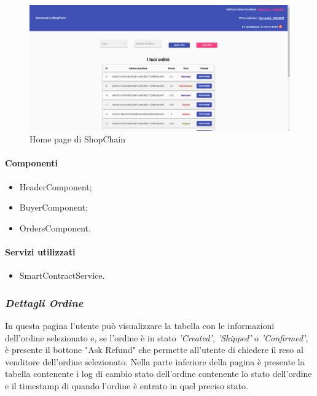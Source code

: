 \begin{figure}[!h] 
    \centering 
    \includegraphics[width=1\columnwidth]{immagini/maschere/homepage.png} 
    \caption{Home page di ShopChain}
\end{figure}

\paragraph{Componenti}
\begin{itemize}
    \item HeaderComponent;
    \item BuyerComponent;
    \item OrdersComponent.
\end{itemize}

\paragraph{Servizi utilizzati}
\begin{itemize}
    \item SmartContractService.
\end{itemize}

\newpage

\subsubsection*{\textit{Dettagli Ordine}}
In questa pagina l'utente può visualizzare la tabella con le informazioni dell'ordine selezionato e, se l'ordine è in stato \textit{'Created', 'Shipped'} o \textit{'Confirmed'}, è presente il bottone "Ask Refund" che permette all'utente di chiedere il reso al venditore dell'ordine selezionato. Nella parte inferiore della pagina è presente la tabella contenente i log di cambio stato dell'ordine contenente lo stato dell'ordine e il timestamp di quando l'ordine è entrato in quel preciso stato.

